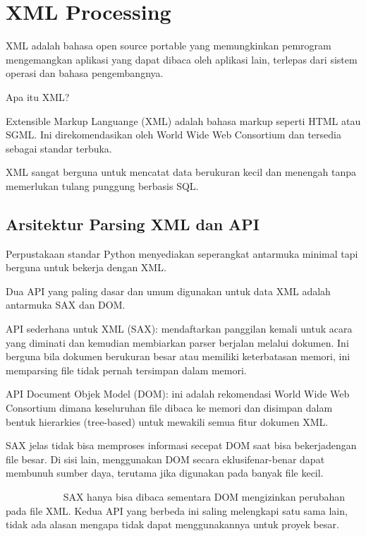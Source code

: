 \documentclass{wileySix}
\begin{document}
\chapter{XML Processing}
XML adalah bahasa open source portable yang memungkinkan pemrogram mengemangkan aplikasi yang dapat dibaca oleh aplikasi lain, terlepas dari sistem operasi dan bahasa pengembangnya. \par
\vspace{12pt}
\noindent 
Apa itu XML? \par
Extensible Markup Languange (XML) adalah bahasa markup seperti HTML atau SGML. Ini direkomendasikan oleh World Wide Web Consortium dan tersedia sebagai standar terbuka.  \par
XML sangat berguna untuk mencatat data berukuran kecil dan menengah tanpa memerlukan tulang punggung berbasis SQL. \par
\vspace{12pt}
\noindent 

\section{Arsitektur Parsing XML dan API}
 \par
\noindent 
\hspace*{0.5in} Perpustakaan standar Python menyediakan seperangkat antarmuka minimal tapi berguna untuk bekerja dengan XML.  \par
\noindent 
\hspace*{0.5in} Dua API yang paling dasar dan umum digunakan untuk data XML adalah antarmuka SAX dan DOM. \par
\noindent 
\hspace*{0.5in} API sederhana untuk XML (SAX): mendaftarkan panggilan kemali untuk acara yang diminati dan kemudian membiarkan parser berjalan melalui dokumen. Ini berguna bila dokumen berukuran besar atau memiliki keterbatasan memori, ini memparsing file tidak pernah tersimpan dalam memori. \par
\noindent 
\hspace*{0.5in} API Document Objek Model (DOM): ini adalah rekomendasi World Wide Web Consortium dimana keseluruhan file dibaca ke memori dan disimpan dalam bentuk hierarkies (tree-based) untuk mewakili semua fitur dokumen XML.  \par
\noindent 
\hspace*{0.5in} SAX jelas tidak bisa memproses informasi secepat DOM saat bisa bekerjadengan file besar. Di sisi lain, menggunakan DOM secara eklusifenar-benar dapat membunuh sumber daya, terutama jika digunakan pada banyak file kecil. \par
\noindent 
~~~~~~~~~~~ SAX hanya bisa dibaca sementara DOM mengizinkan perubahan pada file XML. Kedua API yang berbeda ini saling melengkapi satu sama lain, tidak ada alasan mengapa tidak dapat menggunakannya untuk proyek besar. \par
\noindent 
\end{document}
